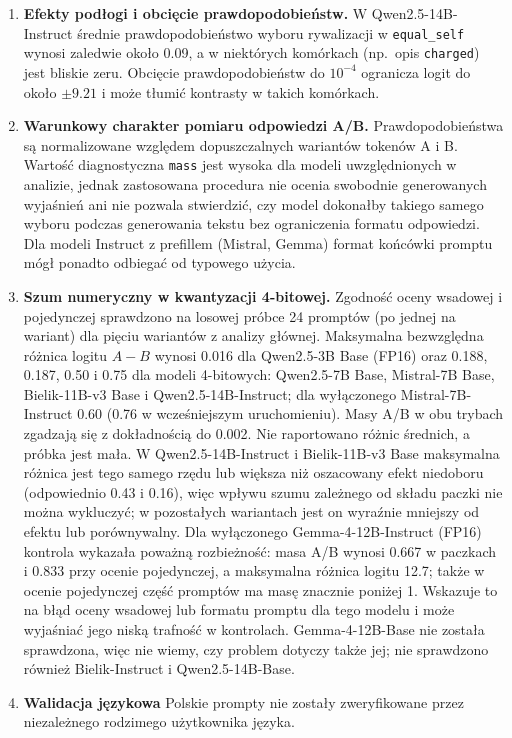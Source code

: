 \documentclass[11pt]{article}
\newcommand{\equalself}{\texttt{equal\_self}}
\begin{document}
\begin{enumerate}[leftmargin=1.6em,itemsep=0.25em]
    \item \textbf{Efekty podłogi i obcięcie prawdopodobieństw.}
    W Qwen2.5-14B-Instruct średnie prawdopodobieństwo wyboru rywalizacji w \equalself{} wynosi zaledwie około 0.09, a w niektórych komórkach (np.\ opis \texttt{charged}) jest bliskie zeru. Obcięcie prawdopodobieństw do $10^{-4}$ ogranicza logit do około $\pm9.21$ i może tłumić kontrasty w takich komórkach.

    \item \textbf{Warunkowy charakter pomiaru odpowiedzi A/B.}
    Prawdopodobieństwa są normalizowane względem dopuszczalnych wariantów tokenów A i B. Wartość diagnostyczna \texttt{mass} jest wysoka dla modeli uwzględnionych w analizie, jednak zastosowana procedura nie ocenia swobodnie generowanych wyjaśnień ani nie pozwala stwierdzić, czy model dokonałby takiego samego wyboru podczas generowania tekstu bez ograniczenia formatu odpowiedzi. Dla modeli Instruct z prefillem (Mistral, Gemma) format końcówki promptu mógł ponadto odbiegać od typowego użycia.

    \item \textbf{Szum numeryczny w kwantyzacji 4-bitowej.}
    Zgodność oceny wsadowej i pojedynczej sprawdzono na losowej próbce 24 promptów (po jednej na wariant) dla pięciu wariantów z analizy głównej. Maksymalna bezwzględna różnica logitu $A-B$ wynosi 0.016 dla Qwen2.5-3B Base (FP16) oraz 0.188, 0.187, 0.50 i 0.75 dla modeli 4-bitowych: Qwen2.5-7B Base, Mistral-7B Base, Bielik-11B-v3 Base i Qwen2.5-14B-Instruct; dla wyłączonego Mistral-7B-Instruct 0.60 (0.76 w wcześniejszym uruchomieniu). Masy A/B w obu trybach zgadzają się z dokładnością do 0.002. Nie raportowano różnic średnich, a próbka jest mała. W Qwen2.5-14B-Instruct i Bielik-11B-v3 Base maksymalna różnica jest tego samego rzędu lub większa niż oszacowany efekt niedoboru (odpowiednio 0.43 i 0.16), więc wpływu szumu zależnego od składu paczki nie można wykluczyć; w pozostałych wariantach jest on wyraźnie mniejszy od efektu lub porównywalny. Dla wyłączonego Gemma-4-12B-Instruct (FP16) kontrola wykazała poważną rozbieżność: masa A/B wynosi 0.667 w paczkach i 0.833 przy ocenie pojedynczej, a maksymalna różnica logitu 12.7; także w ocenie pojedynczej część promptów ma masę znacznie poniżej 1. Wskazuje to na błąd oceny wsadowej lub formatu promptu dla tego modelu i może wyjaśniać jego niską trafność w kontrolach. Gemma-4-12B-Base nie została sprawdzona, więc nie wiemy, czy problem dotyczy także jej; nie sprawdzono również Bielik-Instruct i Qwen2.5-14B-Base.

    \item \textbf{Walidacja językowa}
    Polskie prompty nie zostały zweryfikowane przez niezależnego rodzimego użytkownika języka.

\end{enumerate}
\end{document}
